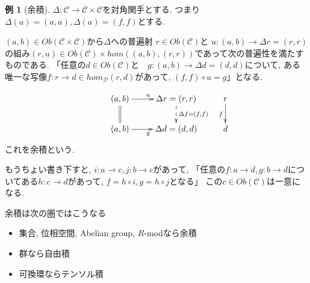 \documentclass[dvipdfmx,a4paper,11pt]{article}
\theoremstyle{definition}
\newtheorem{exa}[thm]{例}
\begin{document}
\begin{exa}[余積]
$\Delta : \mathcal{C} \to \mathcal{C}  \times \mathcal{C} $を対角関手とする.
つまり$\Delta(a)=(a,a), \Delta(a)=(f,f)$とする.

$(a,b) \in Ob(\mathcal{C}  \times \mathcal{C})$から$\Delta$への普遍射
$r \in Ob(\mathcal{C})$と $u: (a,b) \to \Delta r = (r,r)$の組み$(r,u) \in Ob(\mathcal{C})\times hom((a,b), (r,r))$であって次の普遍性を満たすものである.
「任意の$d \in Ob(\mathcal{C} )$と　$g : (a,b)\to \Delta d = (d,d)$について, ある唯一な写像$f : r \to d \in hom_{\mathcal{D}}(r,d)$があって, $(f,f) \circ u = g$」となる.

\begin{equation*}
\xymatrix@C=25pt@R=20pt{
&(a,b)\ar@{=}[d]  \ar@{->}[r]^{u} & \Delta r = (r,r)\ar@{-->}[d]^{\Delta f= (f,f)} &r\ar@{->}[d]_{f}\\
&(a,b)\ar@{->}[r]_{g} &\Delta d = (d,d)&d \\   
}
\end{equation*}
これを余積という.

もうちょい書き下すと, $i : a \to c, j: b\to c$があって, 
「任意の$f : a \to d, g : b \to d$についてある$h : c \to d$があって, $f = h\circ i, g = h\circ j$となる」 この$c \in Ob(\mathcal{C})$は一意になる. 

余積は次の圏ではこうなる
\begin{itemize}
\item 集合, 位相空間, Abelian group, $R$-modなら余積
\item 群なら自由積
\item 可換環ならテンソル積
\end{itemize}
\end{exa}
\end{document}
